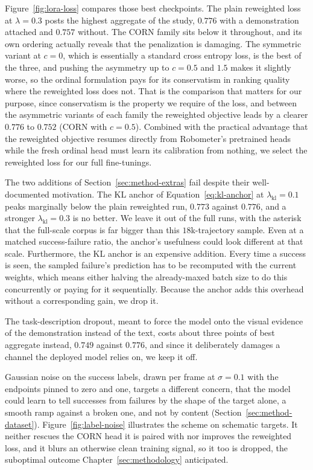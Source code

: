 Figure~\ref{fig:lora-loss} compares those best checkpoints. The plain reweighted loss at $\lambda = 0.3$ posts the highest aggregate of the study, $0.776$ with a demonstration attached and $0.757$ without. The CORN family sits below it throughout, and its own ordering actually reveals that the penalization is damaging. The symmetric variant at $c = 0$, which is essentially a standard cross entropy loss, is the best of the three, and pushing the asymmetry up to $c = 0.5$ and $1.5$ makes it slightly worse, so the ordinal formulation pays for its conservatism in ranking quality where the reweighted loss does not. That is the comparison that matters for our purpose, since conservatism is the property we require of the loss, and between the asymmetric variants of each family the reweighted objective leads by a clearer $0.776$ to $0.752$ (CORN with $c=0.5$). Combined with the practical advantage that the reweighted objective resumes directly from Robometer's pretrained heads while the fresh ordinal head must learn its calibration from nothing, we select the reweighted loss for our full fine-tunings.

The two additions of Section~\ref{sec:method-extras} fail despite their well-documented motivation. The KL anchor of Equation~\ref{eq:kl-anchor} at $\lambda_{\mathrm{kl}} = 0.1$ peaks marginally below the plain reweighted run, $0.773$ against $0.776$, and a stronger $\lambda_{\mathrm{kl}} = 0.3$ is no better. We leave it out of the full runs, with the asterisk that the full-scale corpus is far bigger than this $18$k-trajectory sample. Even at a matched success-failure ratio, the anchor's usefulness could look different at that scale. Furthermore, the KL anchor is an expensive addition. Every time a success is seen, the sampled failure's prediction has to be recomputed with the current weights, which means either halving the already-maxed batch size to do this concurrently or paying for it sequentially. Because the anchor adds this overhead without a corresponding gain, we drop it.

The task-description dropout, meant to force the model onto the visual evidence of the demonstration instead of the text, costs about three points of best aggregate instead, $0.749$ against $0.776$, and since it deliberately damages a channel the deployed model relies on, we keep it off.

Gaussian noise on the success labels, drawn per frame at $\sigma = 0.1$ with the endpoints pinned to zero and one, targets a different concern, that the model could learn to tell successes from failures by the shape of the target alone, a smooth ramp against a broken one, and not by content (Section~\ref{sec:method-dataset}). Figure~\ref{fig:label-noise} illustrates the scheme on schematic targets. It neither rescues the CORN head it is paired with nor improves the reweighted loss, and it blurs an otherwise clean training signal, so it too is dropped, the suboptimal outcome Chapter~\ref{sec:methodology} anticipated.

